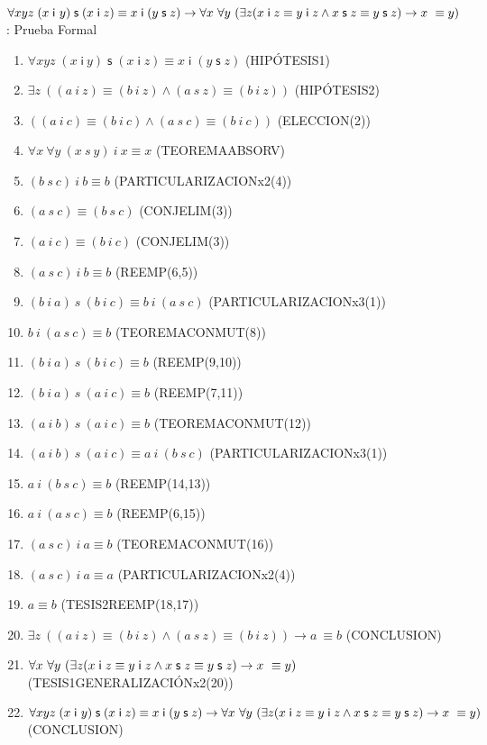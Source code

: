 \documentclass[10pt]{beamer}
\newcommand{\Cfont}{\fontsize{5.5}{7.2}\selectfont}
\newcommand{\Cfonti}{\fontsize{8.5}{7.2}\selectfont}
\newcommand{\Nand}{\wedge}
\newcommand{\idistr}{\forall xyz\;(x\;\mathsf{i}\
y)\;\mathsf{s}\;(x\;\mathsf{i}\;z)\equiv x\;\mathsf{i}\;(y\;\mathsf{s}%
\;z)}
\newcommand{\myconj}{x\;\mathsf{i}\;z\equiv y\;\mathsf{%
i}\;z\wedge x\;\mathsf{s}\;z\equiv y\;\mathsf{s}\;z}
\begin{document}
\begin{frame}{\Cfonti$\idistr \rightarrow \forall x\ \forall y\ (\exists z (\myconj) \rightarrow x\ \equiv y)$:
    Prueba Formal
}
\Cfont
  \begin{enumerate}[<+->]
    \item $ \idistr $ \hfill(HIPÓTESIS1)
    \item $ \exists z\ ((a\ i\ z) \equiv (b\ i\ z) \Nand (a\ s\ z) \equiv (b\ i\ z))$ \hfill(HIPÓTESIS2)
    \item $ ((a\ i\ c) \equiv (b\ i\ c) \Nand (a\ s\ c) \equiv (b\ i\ c))$ \hfill(ELECCION(2))
    \item $ \forall x\ \forall y\ (x\ s\ y)\ i\ x \equiv x$ \hfill(TEOREMAABSORV)
    \item $ (b\ s\ c)\ i\ b \equiv b$ \hfill(PARTICULARIZACIONx2(4))
    \item $ (a\ s\ c) \equiv (b\ s\ c) $ \hfill(CONJELIM(3))
    \item $ (a\ i\ c) \equiv (b\ i\ c) $ \hfill(CONJELIM(3))

    \item $ (a\ s\ c)\ i\ b \equiv b$ \hfill(REEMP(6,5))
    \item $ (b\ i\ a)\ s\ (b\ i\ c) \equiv b\ i\ (a\ s\ c) $ \hfill(PARTICULARIZACIONx3(1))
    \item $ b\ i\ (a\ s\ c) \equiv b$ \hfill(TEOREMACONMUT(8))
    \item $ (b\ i\ a)\ s\ (b\ i\ c) \equiv b$ \hfill(REEMP(9,10))

    \item $ (b\ i\ a)\ s\ (a\ i\ c) \equiv b$ \hfill(REEMP(7,11))
    \item $ (a\ i\ b)\ s\ (a\ i\ c) \equiv b$ \hfill(TEOREMACONMUT(12))
    \item $ (a\ i\ b)\ s\ (a\ i\ c) \equiv a\ i\ (b\ s\ c)$ \hfill(PARTICULARIZACIONx3(1))
    \item $ a\ i\ (b\ s\ c) \equiv b $ \hfill(REEMP(14,13))
    \item $ a\ i\ (a\ s\ c) \equiv b $ \hfill(REEMP(6,15))
    \item $ (a\ s\ c)\ i\ a \equiv b$ \hfill(TEOREMACONMUT(16))
    \item $ (a\ s\ c)\ i\ a \equiv a$ \hfill(PARTICULARIZACIONx2(4))
    \item $ a \equiv b$ \hfill(TESIS2REEMP(18,17))
    \item $ \exists z\ ((a\ i\ z) \equiv (b\ i\ z) \Nand (a\ s\ z) \equiv (b\ i\ z)) \rightarrow a\ \equiv b$ \hfill(CONCLUSION)
    \item $ \forall x\ \forall y\ (\exists z (\myconj) \rightarrow x\ \equiv y)$ \hfill(TESIS1GENERALIZACIÓNx2(20))
    \item $ \idistr \rightarrow \forall x\ \forall y\ (\exists z (\myconj) \rightarrow x\ \equiv y)$ \hfill(CONCLUSION)

  \end{enumerate}
  \setcounter{equation}{0}

\end{frame}
\end{document}
